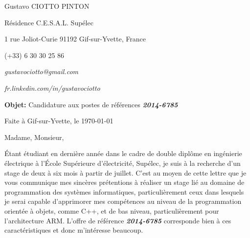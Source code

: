 \documentclass[12pt, a4paper]{article}
\newcommand{\entreprise}{Gemalto }
\newcommand{\offreReference}{2014-6785}
\newcommand{\contactEntreprise}{Madame, Monsieur}
\newcommand{\contactEntrepriseGender}{Madame, Monsieur}
\begin{document}
\pagestyle{empty} 

Gustavo CIOTTO PINTON

Résidence C.E.S.A.L. Supélec

1 rue Joliot-Curie 91192 Gif-sur-Yvette, France

(+33) 6 30 30 25 86	

\textit{gustavociotto@gmail.com}

\textit{fr.linkedin.com/in/gustavociotto}

\vspace{12pt}

\textbf{Objet:} Candidature aux postes de
références \textit{\textbf{\offreReference}}



\begin{flushright}
Faite à Gif-sur-Yvette, le \today




\end{flushright}

\contactEntrepriseGender ,

\vspace{12pt}


Étant étudiant en dernière année dans le cadre de double diplôme en
ingénierie électrique à l’École Supérieure d’électricité, Supélec, je
suis à la recherche d'un stage de deux à six mois à partir de juillet.
%
%
C'est au moyen de cette lettre que je vous communique mes sincères 
prétentions à réaliser un stage lié au domaine de programmation des systèmes
informatiques, particulièrement ceux dans lesquels je serai capable
d'apprimorer mes compétences au niveau de la programmation orientée à objets,
comme C++, et de bas niveau, particulièrement pour l'architecture ARM. L'offre
de référence \textit{\textbf{\offreReference}} corresponde bien à ces
caractéristiques et donc m'intéresse beaucoup.
\end{document}
